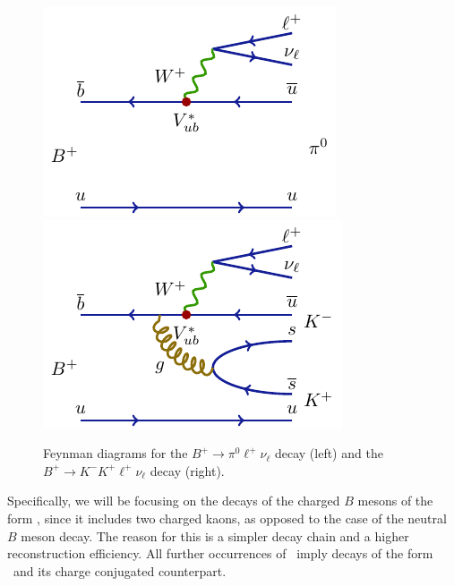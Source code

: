 \begin{figure}[H]
	\centering
	\includegraphics{texfig/B2pilnu}
	\hspace{1cm}
	\includegraphics{texfig/B2KKlnu}
	\captionsetup{width=.8\linewidth}
	\caption{Feynman diagrams for the $B^+ \to \pi^0 \ell^+ \nu_\ell$ decay (left) and the $B^+ \to K^- K^+ \ell^+ \nu_\ell$ decay (right).}
	\label{feynman}
\end{figure}

Specifically, we will be focusing on the decays of the charged $B$ mesons of the form \decayb, since it includes two charged kaons, as opposed to the case of the neutral $B$ meson decay. The reason for this is a simpler decay chain and a higher reconstruction efficiency. All further occurrences of \decaya~imply decays of the form \decayb~and its charge conjugated counterpart.